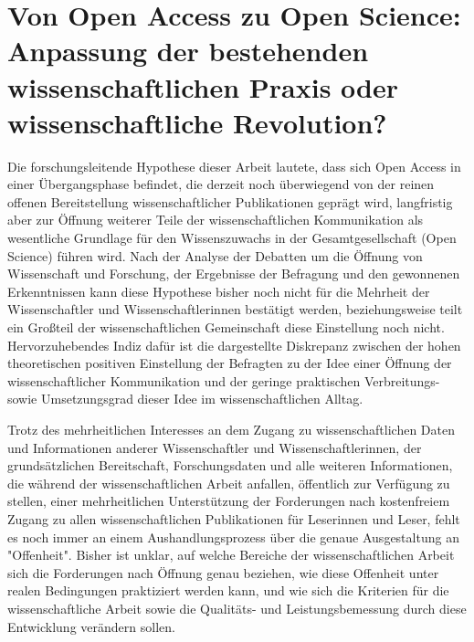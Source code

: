 \section{Von Open Access zu Open Science: Anpassung der bestehenden wissenschaftlichen Praxis oder wissenschaftliche Revolution?}

Die forschungsleitende Hypothese dieser Arbeit lautete, dass sich Open Access in einer Übergangsphase befindet, die derzeit noch überwiegend von der reinen offenen Bereitstellung wissenschaftlicher Publikationen geprägt wird, langfristig aber zur Öffnung weiterer Teile der wissenschaftlichen Kommunikation als wesentliche Grundlage für den Wissenszuwachs in der Gesamtgesellschaft (Open Science) führen wird. Nach der Analyse der Debatten um die Öffnung von Wissenschaft und Forschung, der Ergebnisse der Befragung und den gewonnenen Erkenntnissen kann diese Hypothese bisher noch nicht für die Mehrheit der Wissenschaftler und Wissenschaftlerinnen bestätigt werden, beziehungsweise teilt ein Großteil der wissenschaftlichen Gemeinschaft diese Einstellung noch nicht. Hervorzuhebendes Indiz dafür ist die dargestellte Diskrepanz zwischen der hohen theoretischen positiven Einstellung der Befragten zu der Idee einer Öffnung der wissenschaftlicher Kommunikation und der geringe praktischen Verbreitungs- sowie Umsetzungsgrad dieser Idee im wissenschaftlichen Alltag.

Trotz des mehrheitlichen Interesses an dem Zugang zu wissenschaftlichen Daten und Informationen anderer Wissenschaftler und Wissenschaftlerinnen, der grundsätzlichen Bereitschaft, Forschungsdaten und alle weiteren Informationen, die während der wissenschaftlichen Arbeit anfallen, öffentlich zur Verfügung zu stellen, einer mehrheitlichen Unterstützung der Forderungen nach kostenfreiem Zugang zu allen wissenschaftlichen Publikationen für Leserinnen und Leser, fehlt es noch immer an einem Aushandlungsprozess über die genaue Ausgestaltung an "Offenheit". Bisher ist unklar, auf welche Bereiche der wissenschaftlichen Arbeit sich die Forderungen nach Öffnung genau beziehen, wie diese Offenheit unter realen Bedingungen praktiziert werden kann, und wie sich die Kriterien für die wissenschaftliche Arbeit sowie die Qualitäts- und Leistungsbemessung durch diese Entwicklung verändern sollen.

